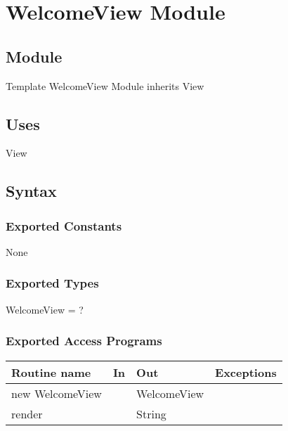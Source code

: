 \documentclass[12pt]{article}
\begin{document}
\newpage






%




\section* {WelcomeView Module}

\subsection*{Module}

Template WelcomeView Module inherits View

\subsection* {Uses}

View

\subsection* {Syntax}

\subsubsection* {Exported Constants}

None

\subsubsection* {Exported Types}

WelcomeView = ?

\subsubsection* {Exported Access Programs}

\begin{tabular}{| l | l | l | p{5cm} |}
\hline
\textbf{Routine name} & \textbf{In} & \textbf{Out} & \textbf{Exceptions}\\
\hline
new WelcomeView &  & WelcomeView & \\
\hline
render & & String & \\
\hline
\end{tabular}
\end{document}

